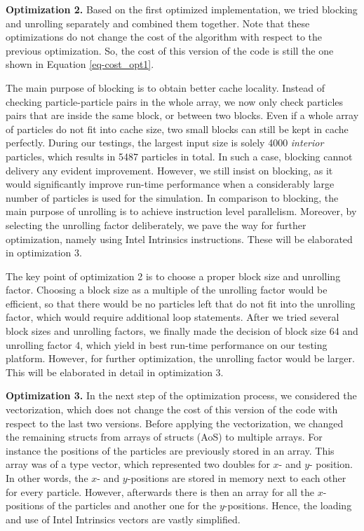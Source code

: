 \documentclass[letterpaper]{article}
\newcommand{\mypar}[1]{{\bf #1.}}
\begin{document}
\mypar{Optimization 2}
Based on the first optimized implementation, we tried blocking and unrolling separately and combined them together. Note that these optimizations do not change the cost of the algorithm with respect to the previous optimization. So, the cost of this version of the code is still the one shown in Equation \ref{eq-cost_opt1}. 

The main purpose of blocking is to obtain better cache locality. Instead of checking particle-particle pairs in the whole array, we now only check particles pairs that are inside the same block, or between two blocks.
Even if a whole array of particles do not fit into cache size, two small blocks can still be kept in cache perfectly.
During our testings, the largest input size is solely 4000 \emph{interior} particles, which results in 5487 particles in total.
In such a case, blocking cannot delivery any evident improvement. However, we still insist on blocking, as it would significantly improve run-time performance when a considerably large number of particles is used for the simulation.
In comparison to blocking, the main purpose of unrolling is to achieve instruction level parallelism. 
Moreover, by selecting the unrolling factor deliberately, we pave the way for further optimization, namely using Intel Intrinsics instructions. These will be elaborated in optimization 3.

The key point of optimization 2 is to choose a proper block size and unrolling factor. Choosing a block size as a multiple of the unrolling factor would be efficient, so that there would be no particles left that do not fit into the unrolling factor, which would require additional loop statements. After we tried several block sizes and unrolling factors, we finally made the decision of block size 64 and unrolling factor 4, which yield in best run-time performance on our testing platform. However, for further optimization, the unrolling factor would be larger. This will be elaborated in detail in optimization 3.

\mypar{Optimization 3}
In the next step of the optimization process, we considered the vectorization, which does not change the cost of this version of the code with respect to the last two versions.
Before applying the vectorization, we changed the remaining structs from arrays of structs (AoS) to multiple arrays.
For instance the positions of the particles are previously stored in an array.
This array was of a type vector, which represented two doubles for $x$- and $y$- position.
In other words, the $x$- and $y$-positions are stored in memory next to each other for every particle.
However, afterwards there is then an array for all the $x$-positions of the particles and another one for the $y$-positions.
Hence, the loading and use of Intel Intrinsics vectors are vastly simplified.
\end{document}
